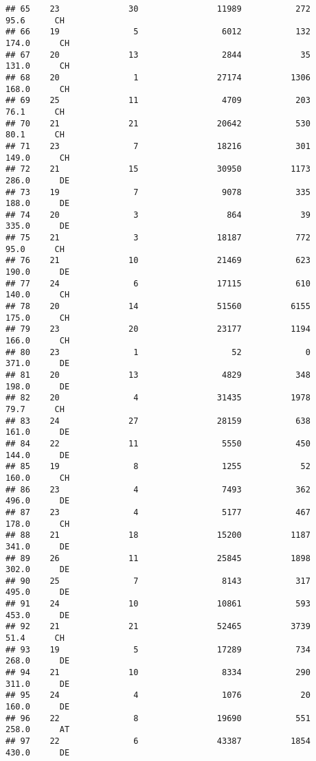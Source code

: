 \documentclass[
]{article}
\begin{document}
\begin{verbatim}
## 65    23              30                11989           272     95.6      CH
## 66    19               5                 6012           132    174.0      CH
## 67    20              13                 2844            35    131.0      CH
## 68    20               1                27174          1306    168.0      CH
## 69    25              11                 4709           203     76.1      CH
## 70    21              21                20642           530     80.1      CH
## 71    23               7                18216           301    149.0      CH
## 72    21              15                30950          1173    286.0      DE
## 73    19               7                 9078           335    188.0      DE
## 74    20               3                  864            39    335.0      DE
## 75    21               3                18187           772     95.0      CH
## 76    21              10                21469           623    190.0      DE
## 77    24               6                17115           610    140.0      CH
## 78    20              14                51560          6155    175.0      CH
## 79    23              20                23177          1194    166.0      CH
## 80    23               1                   52             0    371.0      DE
## 81    20              13                 4829           348    198.0      DE
## 82    20               4                31435          1978     79.7      CH
## 83    24              27                28159           638    161.0      DE
## 84    22              11                 5550           450    144.0      DE
## 85    19               8                 1255            52    160.0      CH
## 86    23               4                 7493           362    496.0      DE
## 87    23               4                 5177           467    178.0      CH
## 88    21              18                15200          1187    341.0      DE
## 89    26              11                25845          1898    302.0      DE
## 90    25               7                 8143           317    495.0      DE
## 91    24              10                10861           593    453.0      DE
## 92    21              21                52465          3739     51.4      CH
## 93    19               5                17289           734    268.0      DE
## 94    21              10                 8334           290    311.0      DE
## 95    24               4                 1076            20    160.0      DE
## 96    22               8                19690           551    258.0      AT
## 97    22               6                43387          1854    430.0      DE

\end{verbatim}
\end{document}

